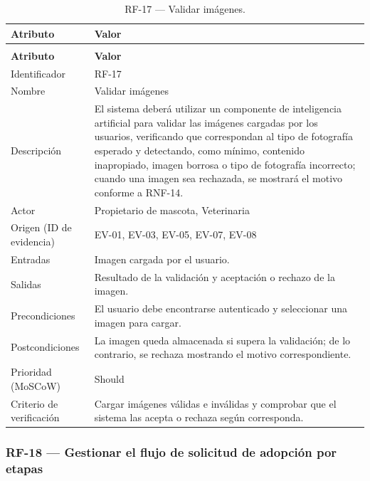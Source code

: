 \documentclass[journal,onecolumn]{IEEEtran}
\makeatletter
\newenvironment{atributos}[2]{%
	\small
	\begin{longtable}{@{}>{\raggedright\arraybackslash}p{4.2cm} >{\raggedright\arraybackslash}p{11.2cm}@{}}
		\caption{#2}\label{tab:#1}\\
		\toprule
		\textbf{Atributo} & \textbf{Valor} \\
		\midrule
		\endfirsthead
		\multicolumn{2}{@{}l}{\small\itshape (continuación)}\\
		\toprule
		\textbf{Atributo} & \textbf{Valor} \\
		\midrule
		\endhead
		\bottomrule
		\endlastfoot
	}{%
	\end{longtable}
	\normalsize
}
\makeatother
\begin{document}
	\begin{atributos}{RF-17}{RF-17 --- Validar imágenes.}
		Identificador & RF-17 \\
		Nombre & Validar imágenes \\
		Descripción & El sistema deberá utilizar un componente de inteligencia artificial para validar las imágenes cargadas por los usuarios, verificando que correspondan al tipo de fotografía esperado y detectando, como mínimo, contenido inapropiado, imagen borrosa o tipo de fotografía incorrecto; cuando una imagen sea rechazada, se mostrará el motivo conforme a RNF-14. \\
		Actor & Propietario de mascota, Veterinaria \\
		Origen (ID de evidencia) & EV-01, EV-03, EV-05, EV-07, EV-08 \\
		Entradas & Imagen cargada por el usuario. \\
		Salidas & Resultado de la validación y aceptación o rechazo de la imagen. \\
		Precondiciones & El usuario debe encontrarse autenticado y seleccionar una imagen para cargar. \\
		Postcondiciones & La imagen queda almacenada si supera la validación; de lo contrario, se rechaza mostrando el motivo correspondiente. \\
		Prioridad (MoSCoW) & Should \\
		Criterio de verificación & Cargar imágenes válidas e inválidas y comprobar que el sistema las acepta o rechaza según corresponda. \\
	\end{atributos}
	
	\subsubsection{RF-18 --- Gestionar el flujo de solicitud de adopción por etapas}
	
\end{document}
